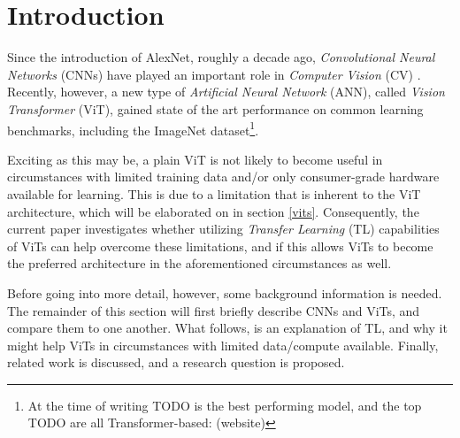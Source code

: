 \section{Introduction}
Since the introduction of AlexNet, roughly a decade ago, \textit{Convolutional Neural Networks} (CNNs) have played an important role in \textit{Computer Vision} (CV) \citep{krizhevsky2012imagened}. Recently, however, a new type of \textit{Artificial Neural Network} (ANN), called \textit{Vision Transformer} (ViT), gained state of the art performance on common learning benchmarks, including the ImageNet dataset\footnote{At the time of writing TODO is the best performing model, and the top TODO are all Transformer-based: (website)}.

Exciting as this may be, a plain ViT is not likely to become useful in circumstances with limited training data and/or only consumer-grade hardware available for learning. This is due to a limitation that is inherent to the ViT architecture, which will be elaborated on in section \ref{vits}. Consequently, the current paper investigates whether utilizing \textit{Transfer Learning} (TL) capabilities of ViTs can help overcome these limitations, and if this allows ViTs to become the preferred architecture in the aforementioned circumstances as well.

Before going into more detail, however, some background information is needed. The remainder of this section will first briefly describe CNNs and ViTs, and compare them to one another. What follows, is an explanation of TL, and why it might help ViTs in circumstances with limited data/compute available. Finally, related work is discussed, and a research question is proposed.


